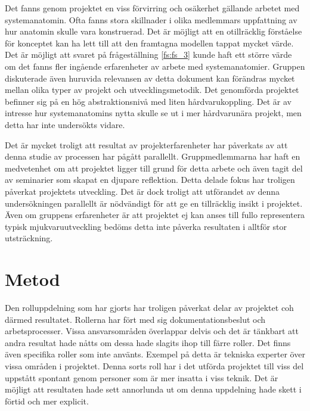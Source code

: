 

Det fanns genom projektet en viss förvirring och osäkerhet gällande arbetet med systemanatomin. Ofta fanns stora skillnader i olika medlemmars uppfattning av hur anatomin skulle vara konstruerad. Det är möjligt att en otillräcklig förståelse för konceptet kan ha lett till att den framtagna modellen tappat mycket värde. Det är möjligt att svaret på frågeställning \ref{fs:fs_3} kunde haft ett större värde om det fanns fler ingående erfarenheter av arbete med systemanatomier. Gruppen diskuterade även huruvida relevansen av detta dokument kan förändras mycket mellan olika typer av projekt och utvecklingsmetodik. Det genomförda projektet befinner sig på en hög abstraktionsnivå med liten hårdvarukoppling. Det är av intresse hur systemanatomins nytta skulle se ut i mer hårdvarunära projekt, men detta har inte undersökts vidare.

Det är mycket troligt att resultat av projekterfarenheter har påverkats av att denna studie av processen har pågått parallellt. Gruppmedlemmarna har haft en medvetenhet om att projektet ligger till grund för detta arbete och även tagit del av seminarier som skapat en djupare reflektion. Detta delade fokus har troligen påverkat projektets utveckling. Det är dock troligt att utförandet av denna undersökningen parallellt är nödvändigt för att ge en tillräcklig insikt i projektet. Även om gruppens erfarenheter är att projektet ej kan anses till fullo representera typisk mjukvaruutveckling bedöms detta inte påverka resultaten i alltför stor utsträckning.


\section{Metod}
\label{sec:discussion-method}
Den rolluppdelning som har gjorts har troligen påverkat delar av projektet coh därmed resultatet. Rollerna har fört med sig dokumentationsbeslut och arbetsprocesser. Vissa ansvarsområden överlappar delvis och det är tänkbart att andra resultat hade nåtts om dessa hade slagits ihop till färre roller. Det finns även specifika roller som inte använts. Exempel på detta är tekniska experter över vissa områden i projektet. Denna sorts roll har i det utförda projektet till viss del uppstått spontant genom personer som är mer insatta i viss teknik. Det är möjligt att resultaten hade sett annorlunda ut om denna uppdelning hade skett i förtid och mer explicit.

